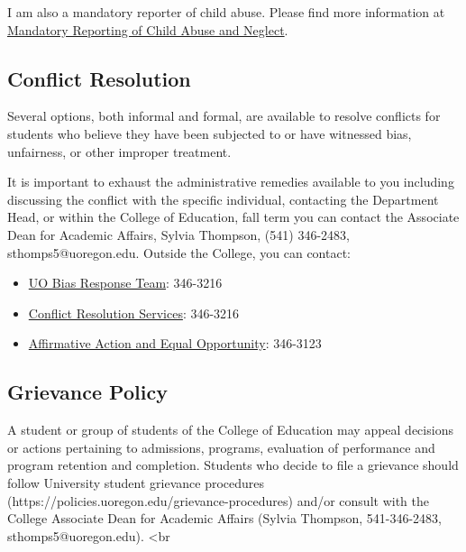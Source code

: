 \documentclass[
  letterpaper,
  DIV=11,
  numbers=noendperiod]{scrartcl}
\providecommand{\tightlist}{%
  \setlength{\itemsep}{0pt}\setlength{\parskip}{0pt}}\usepackage{longtable,booktabs,array}
\begin{document}
I am also a mandatory reporter of child abuse. Please find more
information at
\href{https://hr.uoregon.edu/policies-leaves/general-information/mandatory-reporting-child-abuse-and-neglect}{Mandatory
Reporting of Child Abuse and Neglect}.

\hypertarget{conflict-resolution}{%
\subsection{Conflict Resolution}\label{conflict-resolution}}

Several options, both informal and formal, are available to resolve
conflicts for students who believe they have been subjected to or have
witnessed bias, unfairness, or other improper treatment.

It is important to exhaust the administrative remedies available to you
including discussing the conflict with the specific individual,
contacting the Department Head, or within the College of Education, fall
term you can contact the Associate Dean for Academic Affairs, Sylvia
Thompson, (541) 346-2483, sthomps5@uoregon.edu. Outside the College, you
can contact:

\begin{itemize}
\tightlist
\item
  \href{http://bias.uoregon.edu/whatbrt.htm}{UO Bias Response Team}:
  346-3216\\
\item
  \href{http://studentlife.uoregon.edu/support}{Conflict Resolution
  Services}: 346-3216
\item
  \href{http://aaeo.uoregon.edu/}{Affirmative Action and Equal
  Opportunity}: 346-3123
\end{itemize}

\hypertarget{grievance-policy}{%
\subsection{Grievance Policy}\label{grievance-policy}}

A student or group of students of the College of Education may appeal
decisions or actions pertaining to admissions, programs, evaluation of
performance and program retention and completion. Students who decide to
file a grievance should follow University student grievance procedures
(https://policies.uoregon.edu/grievance-procedures) and/or consult with
the College Associate Dean for Academic Affairs (Sylvia Thompson,
541-346-2483, sthomps5@uoregon.edu). \textless br
\end{document}
